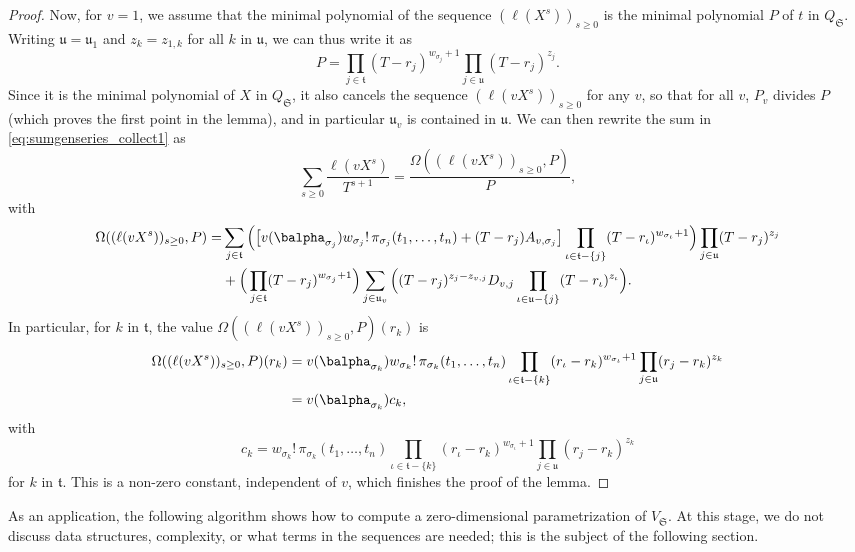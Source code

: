 \documentclass[12pt]{article}
\newcommand{\minpoly}{P}
\newcommand{\lf}{X}
\begin{document}
\begin{proof}
  Now, for $v=1$, we assume that the minimal polynomial of the sequence
  $(\ell(\lf^s))_{s \ge 0}$ is the minimal polynomial $\minpoly$ of $t$ in
  $Q_\mathfrak{S}$.  Writing $\mathfrak{u}=\mathfrak{u}_1$ and
  $z_k=z_{1,k}$ for all $k$ in $\mathfrak{u}$, we can thus write it as
  $$\minpoly=\prod_{j \in \mathfrak{t}} (T-r_{j})^{w_{\sigma_{j}}+1}
  \prod_{j \in \mathfrak{u}} (T-r_{j})^{z_{j}}.$$ Since it is the
  minimal polynomial of $\lf$ in $Q_\mathfrak{S}$, it also cancels the
  sequence $(\ell(v \lf^s))_{s \ge 0}$ for any $v$, so that for all
  $v$, $\minpoly_v$ divides $\minpoly$ (which proves the first point
  in the lemma), and in particular $\mathfrak{u}_v$ is contained in
  $\mathfrak{u}$.
  We can then rewrite the
  sum in \cref{eq:sumgenseries_collect1} as $$ \sum_{s \ge 0} \frac{\ell(v \lf^s)}{T^{s+1}} =\frac{\Omega((\ell(v \lf^s))_{s \ge 0} ,\minpoly)}{\minpoly},$$ with
  \begin{align*}
    \Omega((\ell(v \lf^s))_{s \ge 0} ,\minpoly)=&\sum_{j \in \mathfrak{t}} \Big(\big[
      v(\balpha_{\sigma_{j}})  w_{\sigma_j}!\, \pi_{\sigma_j}(t_1,\dots,t_n)
      + (T-r_j) A_{v,\sigma_j}\big]
    \prod_{\iota \in \mathfrak{t}-\{j\}}(T-r_{\iota} )^{w_{\sigma_{\iota}}+1}
    \Big)\prod_{j \in \mathfrak{u}}(T-r_j )^{z_j}
    \\
    &+
    \Big(\prod_{j \in \mathfrak{t}}(T-r_{j} )^{w_{\sigma_j}+1}\Big)
    \sum_{j \in \mathfrak{u}_v} \Big (
    (T-r_j)^{z_{j}-z_{v,j}} D_{v,j}
    \prod_{\iota \in \mathfrak{u}-\{j\}}(T-r_{\iota} )^{z_{\iota}}\Big).
  \end{align*}
  In particular, 
  for $k$ in $\mathfrak{t}$,
  the value $\Omega((\ell(v \lf^s))_{s \ge 0} ,\minpoly)(r_k)$ is 
  \begin{align*}
    \Omega((\ell(v \lf^s))_{s \ge 0} ,\minpoly)(r_k)&= v(\balpha_{\sigma_{k}}) w_{\sigma_k}!\, \pi_{\sigma_k}(t_1,\dots,t_n)
    \prod_{\iota \in \mathfrak{t}-\{k\}}(r_\iota-r_{k} )^{w_{\sigma_{\iota}}+1}
    \prod_{j \in \mathfrak{u}}(r_j-r_{k} )^{z_{k}}\\
    &= v(\balpha_{\sigma_{k}}) c_{k},
  \end{align*}
  with 
  $$c_{k}=
  w_{\sigma_k}!\, \pi_{\sigma_k}(t_1,\dots,t_n)
  \prod_{\iota \in \mathfrak{t}-\{k\}}(r_\iota-r_{k} )^{w_{\sigma_{\iota}}+1}
  \prod_{j \in \mathfrak{u}}(r_j-r_{k} )^{z_{k}}$$
  for $k$ in $\mathfrak{t}$. This is a non-zero constant, independent 
  of $v$, which finishes the proof of the lemma.
\end{proof}

As an application, the following algorithm shows how to compute a
zero-dimensional parametrization of $V_{\mathfrak{S}}$. At this stage,
we do not discuss data structures, complexity, or what terms in the
sequences are needed; this is the subject of the following section.
\end{document}
